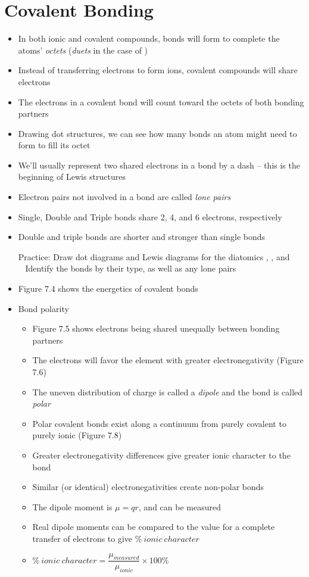 \documentclass[12pt, openany, letterpaper]{memoir}
\begin{document}
\section{Covalent Bonding}
\begin{itemize}
	\item In both ionic and covalent compounds, bonds will form to complete the atoms' \emph{octets} (\emph{duets} in the case of )
	\item Instead of transferring electrons to form ions, covalent compounds will share electrons
	\item The electrons in a covalent bond will count toward the octets of both bonding partners
	\item Drawing dot structures, we can see how many bonds an atom might need to form to fill its octet
	\item We'll usually represent two shared electrons in a bond by a dash -- this is the beginning of Lewis structures
	\item Electron pairs not involved in a bond are called \emph{lone pairs}
	\item Single, Double and Triple bonds share 2, 4, and 6 electrons, respectively
	\item Double and triple bonds are shorter and stronger than single bonds

	      Practice: Draw dot diagrams and Lewis diagrams for the diatomics , , and \\
	      ~\hphantom{Practice: } Identify the bonds by their type, as well as any lone pairs
  \item Figure 7.4 shows the energetics of covalent bonds
  \item Bond polarity
    \begin{itemize}
      \item Figure 7.5 shows electrons being shared unequally between bonding partners
      \item The electrons will favor the element with greater electronegativity (Figure 7.6)
      \item The uneven distribution of charge is called a \emph{dipole} and the bond is called \emph{polar}
      \item Polar covalent bonds exist along a continuum from purely covalent to purely ionic (Figure 7.8)
      \item Greater electronegativity differences give greater ionic character to the bond
      \item Similar (or identical) electronegativities create non-polar bonds
      \item The dipole moment is $\mu=qr$, and can be measured
      \item Real dipole moments can be compared to the value for a complete transfer of electrons to give $\%~ionic~character$
      \item $\%~ionic~character=\dfrac{\mu_{measured}}{\mu_{ionic}}\times100\%$
    \end{itemize}
\end{itemize}
\end{document}
